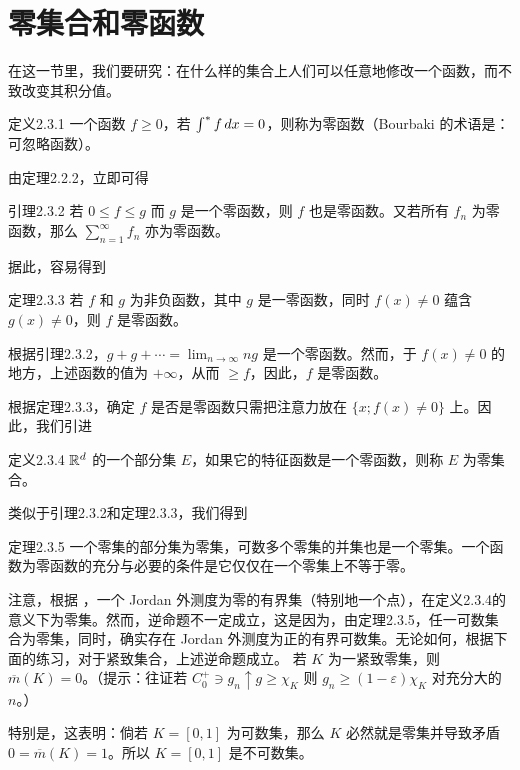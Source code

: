 \section{零集合和零函数}
在这一节里，我们要研究：在什么样的集合上人们可以任意地修改一个函数，而不致改变其积分值。
\begin{statement}{定义}{2.3.1}
一个函数 $f\ge0$，若 $\int^{*} f\,dx=0$，则称为零函数（Bourbaki 的术语是：可忽略函数）。
\end{statement}
由定理2.2.2，立即可得
\begin{statement}{引理}{2.3.2}
若 $0\le f\le g$ 而 $g$ 是一个零函数，则 $f$ 也是零函数。又若所有 $f_n$ 为零函数，那么 $\sum_{n=1}^\infty f_n$ 亦为零函数。
\end{statement}
据此，容易得到
\begin{statement}{定理}{2.3.3}
若 $f$ 和 $g$ 为非负函数，其中 $g$ 是一零函数，同时 $f(x)\ne0$ 蕴含 $g(x)\ne0$，则 $f$ 是零函数。
\end{statement}
\Proof 根据引理2.3.2，$g+g+\cdots=\lim_{n\to\infty}ng$ 是一个零函数。然而，于 $f(x)\ne0$ 的地方，上述函数的值为 $+\infty$，从而 $\ge f$，因此，$f$ 是零函数。

根据定理2.3.3，确定 $f$ 是否是零函数只需把注意力放在 $\{x;f(x)\ne0\}$ 上。因此，我们引进
\begin{statement}{定义}{2.3.4}
$\mathbb R^d$ 的一个部分集 $E$，如果它的特征函数是一个零函数，则称 $E$ 为零集合。
\end{statement}
类似于引理2.3.2和定理2.3.3，我们得到
\begin{statement}{定理}{2.3.5}
一个零集的部分集为零集，可数多个零集的并集也是一个零集。一个函数为零函数的充分与必要的条件是它仅仅在一个零集上不等于零。
\end{statement}
注意，根据 ，一个 Jordan 外测度为零的有界集（特别地一个点），在定义2.3.4的意义下为零集。然而，逆命题不一定成立，这是因为，由定理2.3.5，任一可数集合为零集，同时，确实存在 Jordan 外测度为正的有界可数集。无论如何，根据下面的练习，对于紧致集合，上述逆命题成立。
\Exercise 若 $K$ 为一紧致零集，则 $\overline m(K)=0$。（提示：往证若 $C_0^+\ni g_n\uparrow g\ge\chi_K$ 则 $g_n\ge(1-\varepsilon)\chi_K$ 对充分大的 $n$。）

特别是，这表明：倘若 $K=[0,1]$ 为可数集，那么 $K$ 必然就是零集并导致矛盾 $0=\overline m(K)=1$。所以 $K=[0,1]$ 是不可数集。

